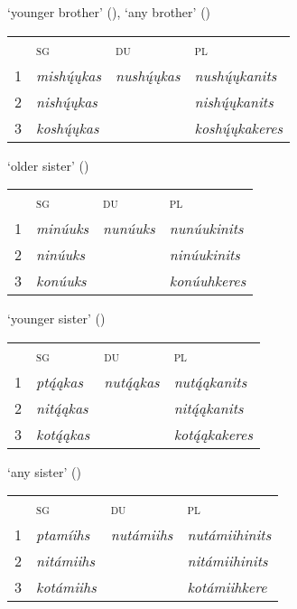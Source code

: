 \begin{exe}
\begin{xlist}
\item\label{ListOfKinshipTerms4} `younger brother' (\Male), `any brother' (\Female)

    \begin{tabular}{llll}
    ~ &\textsc{sg}&\textsc{du}&\textsc{pl}\\
    1&  \textit{mishų́ųkas}&   \textit{nushų́ųkas}                                         &\textit{nushų́ųkanits}\\
    2&  \textit{nishų́ųkas}&    &\textit{nishų́ųkanits}\\
    3&  \textit{koshų́ųkas}&    &\textit{koshų́ųkakeres}
    \end{tabular}
    

\item\label{ListOfKinshipTerms5} `older sister' (\Female)

    \begin{tabular}{llll}
    ~ &\textsc{sg}&\textsc{du}&\textsc{pl}\\
    1&  \textit{minúuks}&   \textit{nunúuks}                                         &\textit{nunúukinits}\\
    2&  \textit{ninúuks}&    &\textit{ninúukinits}\\
    3&  \textit{konúuks}&    &\textit{konúuhkeres}
    \end{tabular}
    
\item\label{ListOfKinshipTerms6} `younger sister' (\Female)

    \begin{tabular}{llll}
    ~ &\textsc{sg}&\textsc{du}&\textsc{pl}\\
    1&  \textit{ptą́ąkas}&   \textit{nutą́ąkas}                                         &\textit{nutą́ąkanits}\\
    2&  \textit{nitą́ąkas}&    &\textit{nitą́ąkanits}\\
    3&  \textit{kotą́ąkas}&    &\textit{kotą́ąkakeres}
    \end{tabular}

\item\label{ListOfKinshipTerms7} `any sister' (\Male)

    \begin{tabular}{llll}
    ~ &\textsc{sg}&\textsc{du}&\textsc{pl}\\
    1&  \textit{ptamíihs}&   \textit{nutámiihs}                                         &\textit{nutámiihinits}\\
    2&  \textit{nitámiihs}&    &\textit{nitámiihinits}\\
    3&  \textit{kotámiihs}&    &\textit{kotámiihkere}
    \end{tabular}


\end{xlist}
\end{exe}
